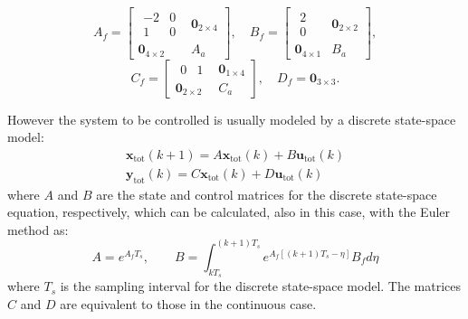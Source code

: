 \documentclass[conference, 11pt]{IEEEtran}
\begin{document}
\[ 
A_f=\begin{bmatrix}
\begin{matrix}-2&0\\1&0\end{matrix}&\textbf{0}_{2\times4}\\
\textbf{0}_{4\times2}&A_a
\end{bmatrix},
\quad
B_f=\begin{bmatrix}\begin{matrix}2\\0\end{matrix}&\textbf{0}_{2\times2}\\
\textbf{0}_{4\times1}&B_a
\end{bmatrix},
\]
\[
C_f=\begin{bmatrix}
\begin{matrix}0&1\end{matrix}&\textbf{0}_{1\times4}\\
\textbf{0}_{2\times2}&C_a
\end{bmatrix}, 
\quad
D_f=\textbf{0}_{3\times3}. 
\]

However the system to be controlled is usually modeled by a discrete state-space model:
\begin{equation}
\label{eqn:full_dynamics_model_disc}
\begin{array}{rr}
{\textbf{x}}_{\text{tot}}(k+1) =A \textbf{x}_{\text{tot}}(k)+ B \textbf{u}_{\text{tot}}(k)\\
\textbf{y}_{\text{tot}}(k) =C\textbf{x}_{\text{tot}}(k) + D \textbf{u}_{\text{tot}}(k)
\end{array}
\end{equation}
where $A$ and $B$ are the state and control matrices for the discrete state-space equation, respectively, which can be calculated, also in this case, with the Euler method as:
\[
A = e^{A_fT_s},\qquad B = \int_{kT_s}^{(k+1)T_s} e^{A_f[(k+1)T_s-\eta]}B_f d\eta
\]
where $T_s$ is the sampling interval for the discrete state-space model. The matrices $C$ and $D$ are equivalent to those in the continuous case.
\end{document}
